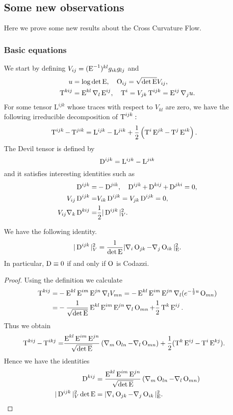 \documentclass[a4paper,12pt]{amsart}
\begin{document}
\subsection{Some new observations}
Here we prove some new results about the Cross Curvature Flow.
\subsubsection{Basic equations}
\label{subsec:xcf_eq}
We start by defining \(V_{ij}=(\operatorname{E}^{-1})^{kl}g_{ik}g_{lj}\)
and
\begin{align}
u&=\log\det\operatorname{E},\quad
\operatorname{O}_{ij}=\sqrt{\det\operatorname{E}}V_{ij},\\
\operatorname{T}^{kij}&=\operatorname{E}^{kl}\nabla_l \operatorname{E}^{ij},\quad \operatorname{T}^i=V_{jk}\operatorname{T}^{ijk}=\operatorname{E}^{ij}\nabla_ju.
\end{align}
For some tensor $\mathrm{L}^{ijk}$ whose traces with respect to $V_{kl}$ are zero, we have the following irreducible decomposition of $\operatorname{T}^{ijk}:$
\begin{align}
\operatorname{T}^{ijk}-\operatorname{T}^{jik}&=\mathrm{L}^{ijk}-\mathrm{L}^{jik}+\frac{1}{2}\left(\operatorname{T}^i\operatorname{E}^{jk}-\operatorname{T}^j\operatorname{E}^{ik}\right).
\end{align}
The Devil tensor is defined by
\[\operatorname{D}^{ijk}=\mathrm{L}^{ijk}-\mathrm{L}^{jik}\]
and it satisfies interesting identities such as
\begin{align}
\operatorname{D}^{ijk}=&-\operatorname{D}^{jik},\quad \operatorname{D}^{ijk}+\operatorname{D}^{kij}+\operatorname{D}^{jki}=0,\\
V_{ij}\operatorname{D}^{ijk}=&V_{ik}\operatorname{D}^{ijk}=V_{jk}\operatorname{D}^{ijk}=0,\\
V_{ij}\nabla_k\operatorname{D}^{kij}=&\frac{1}{2}|\operatorname{D}^{ijk}|_V^2.
\end{align}
\begin{lemma}
\label{lem:cubicform_codazzi}
We have the following identity.
\begin{align}
|\operatorname{D}^{ijk}|_V^2=\frac{1}{\det\operatorname{E}}|\nabla_i\operatorname{O}_{jk}-\nabla_j\operatorname{O}_{ik}|_{\operatorname{E}}^2.
\end{align}
In particular, \(\operatorname{D}\equiv 0\) if and only if \(\operatorname{O}\) is Codazzi.
\end{lemma}
\begin{proof}
Using the definition we calculate
\begin{align}
\operatorname{T}^{kij}=&-\operatorname{E}^{kl}\operatorname{E}^{im}\operatorname{E}^{jn}\nabla_l V_{mn}=-\operatorname{E}^{kl}\operatorname{E}^{im}\operatorname{E}^{jn}\nabla_l (e^{-\frac{1}{2}u}\operatorname{O}_{mn})\\
=&-\frac{1}{\sqrt{\det\operatorname{E}}}\operatorname{E}^{kl}\operatorname{E}^{im}\operatorname{E}^{jn}\nabla_l \operatorname{O}_{mn}+\frac{1}{2}\operatorname{T}^k\operatorname{E}^{ij}.
\end{align}
Thus we obtain
\begin{align*}
\operatorname{T}^{kij}-\operatorname{T}^{ikj}=&\frac{\operatorname{E}^{kl}\operatorname{E}^{im}\operatorname{E}^{jn}}{\sqrt{\det\operatorname{E}}}\left(\nabla_m \operatorname{O}_{ln}-\nabla_l \operatorname{O}_{mn}\right)+\frac{1}{2}(\operatorname{T}^k\operatorname{E}^{ij}-\operatorname{T}^i\operatorname{E}^{kj}).
\end{align*}
Hence we have the identities
\begin{align}
\operatorname{D}^{kij}&=\frac{\operatorname{E}^{kl}\operatorname{E}^{im}\operatorname{E}^{jn}}{\sqrt{\det\operatorname{E}}}\left(\nabla_m \operatorname{O}_{ln}-\nabla_l \operatorname{O}_{mn}\right)\\
|\operatorname{D}^{ijk}|_V^2\det\operatorname{E}&=|\nabla_i\operatorname{O}_{jk}-\nabla_j\operatorname{O}_{ik}|_{\operatorname{E}}^2.
\end{align}
\end{proof}
\end{document}
